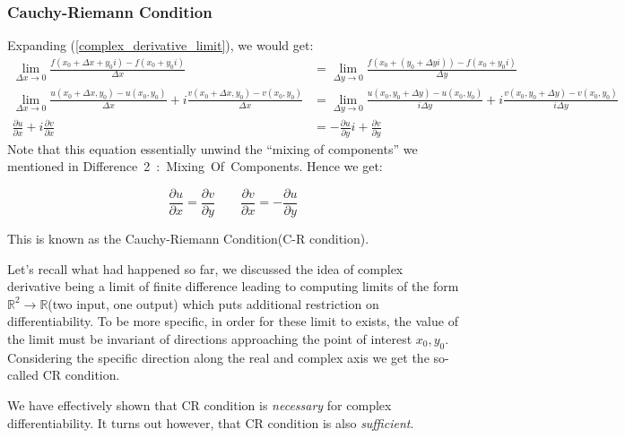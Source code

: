 \subsubsection{Cauchy-Riemann Condition}

Expanding (\ref{complex_derivative_limit}), we would get:
\begin{equation}
\begin{aligned}
\lim_{\Delta x\to 0} \frac{f(x_0+\Delta x + y_0i) - f(x_0+y_0i)}{\Delta x} &= \lim_{\Delta y\to 0} \frac{f(x_0 + (y_0+\Delta yi)) - f(x_0+y_0i)}{\Delta y} \\
\lim_{\Delta x\to 0}\frac{u(x_0+\Delta x, y_0)-u(x_0,y_0)}{\Delta x} + i \frac{v(x_0+\Delta x, y_0)-v(x_0,y_0)}{\Delta x} &=  
\lim_{\Delta y\to 0}\frac{u(x_0, y_0+\Delta y)-u(x_0,y_0)}{i\Delta y} + i \frac{v(x_0, y_0+\Delta y)-v(x_0,y_0)}{i\Delta y}\\
\frac{\partial u}{\partial x}+i\frac{\partial v}{\partial x} &= -\frac{\partial u}{\partial y}i + \frac{\partial v}{\partial y}
\end{aligned}
\end{equation}
Note that this equation essentially unwind the ``mixing of components'' we mentioned in Difference~2~:~Mixing~Of~Components. Hence we get:

\begin{equation}
\label{cr}
\boxed{\frac{\partial u}{\partial x} = \frac{\partial v}{\partial y} \qquad 
\frac{\partial v}{\partial x} =  - \frac{\partial u}{\partial y}}
\end{equation}

This is known as the Cauchy-Riemann Condition(C-R condition).

Let's recall what had happened so far, we discussed the idea of complex derivative being a limit of finite difference leading to computing limits of the form $\mathbb{R}^2\to \mathbb{R}$(two input, one output) which puts additional restriction on differentiability. To be more specific, in order for these limit to exists, the value of the limit must be invariant of directions approaching the point of interest $x_0, y_0$. Considering the specific direction along the real and complex axis we get the so-called CR condition.

We have effectively shown that CR condition is \textit{necessary} for complex differentiability. It turns out however, that CR condition is also \textit{sufficient}.

